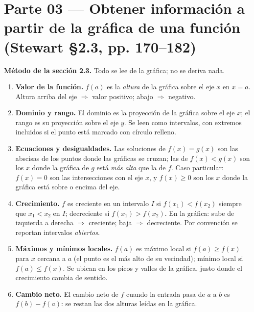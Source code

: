 \documentclass[11pt]{article}
\begin{document}
\shorthandoff{<>}  %

\section*{Parte 03 — Obtener información a partir de la gráfica de una función (Stewart §2.3, pp. 170--182)}

\begin{teo}
\textbf{Método de la sección 2.3.} Todo se lee de la gráfica; no se deriva nada.
\begin{enumerate}[leftmargin=*]
\item \textbf{Valor de la función.} $f(a)$ es la \emph{altura} de la gráfica sobre el eje $x$ en $x=a$. Altura arriba del eje $\Rightarrow$ valor positivo; abajo $\Rightarrow$ negativo.
\item \textbf{Dominio y rango.} El dominio es la proyección de la gráfica sobre el eje $x$; el rango es su proyección sobre el eje $y$. Se leen como intervalos, con extremos incluidos si el punto está marcado con círculo relleno.
\item \textbf{Ecuaciones y desigualdades.} Las soluciones de $f(x)=g(x)$ son las abscisas de los puntos donde las gráficas se cruzan; las de $f(x)<g(x)$ son los $x$ donde la gráfica de $g$ está \emph{más alta} que la de $f$. Caso particular: $f(x)=0$ son las intersecciones con el eje $x$, y $f(x)\ge 0$ son los $x$ donde la gráfica está sobre o encima del eje.
\item \textbf{Crecimiento.} $f$ es creciente en un intervalo $I$ si $f(x_1)<f(x_2)$ siempre que $x_1<x_2$ en $I$; decreciente si $f(x_1)>f(x_2)$. En la gráfica: sube de izquierda a derecha $\Rightarrow$ creciente; baja $\Rightarrow$ decreciente. Por convención se reportan intervalos \emph{abiertos}.
\item \textbf{Máximos y mínimos locales.} $f(a)$ es máximo local si $f(a)\ge f(x)$ para $x$ cercana a $a$ (el punto es el más alto de su vecindad); mínimo local si $f(a)\le f(x)$. Se ubican en los picos y valles de la gráfica, justo donde el crecimiento cambia de sentido.
\item \textbf{Cambio neto.} El cambio neto de $f$ cuando la entrada pasa de $a$ a $b$ es $f(b)-f(a)$: se restan las dos alturas leídas en la gráfica.
\end{enumerate}
\end{teo}
\end{document}
